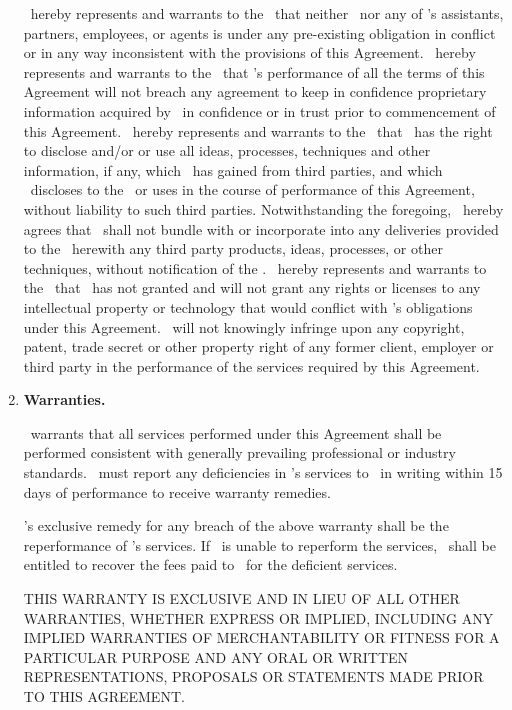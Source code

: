 \documentclass[a4paper,10pt,notitlepage,twocolumn]{article}
\begin{document}
\begin{enumerate}
\cntrref\ hereby represents and warrants to the \clref\ that neither \cntrref\ nor any of \cntrref 's assistants, partners, employees, or agents is under any pre-existing obligation in conflict or in any way inconsistent with the provisions of this Agreement. \cntrref\ hereby represents and warrants to the \clref\ that \cntrref 's performance of all the terms of this Agreement will not breach any agreement to keep in confidence proprietary information acquired by \cntrref\ in confidence or in trust prior to commencement of this Agreement. \cntrref\ hereby represents and warrants to the \clref\ that \cntrref\ has the right to disclose and/or or use all ideas, processes, techniques and other information, if any, which \cntrref\ has gained from third parties, and which \cntrref\ discloses to the \clref\ or uses in the course of performance of this Agreement, without liability to such third parties.  Notwithstanding the foregoing, \cntrref\ hereby agrees that \cntrref\ shall not bundle with or incorporate into any deliveries provided to the \clref\ herewith any third party products, ideas, processes, or other techniques, without notification of the \clref .  \cntrref\ hereby represents and warrants to the \clref\ that \cntrref\ has not granted and will not grant any rights or licenses to any intellectual property or technology that would conflict with \cntrref 's obligations under this Agreement.  \cntrref\ will not knowingly infringe upon any copyright, patent, trade secret or other property right of any former client, employer or third party in the performance of the services required by this Agreement.


\item \textbf{Warranties.}

\cntrref\ warrants that all services performed under this Agreement shall be performed consistent with generally prevailing professional or industry standards. \clref\ must report any deficiencies in \cntrref 's services to \cntrref\ in writing within 15 days of performance to receive warranty remedies.

\clref 's exclusive remedy for any breach of the above warranty shall be the reperformance of \cntrref 's services. If \cntrref\ is unable to reperform the services, \clref\ shall be entitled to recover the fees paid to \cntrref\ for the deficient services. 

THIS WARRANTY IS EXCLUSIVE AND IN LIEU OF ALL OTHER WARRANTIES, WHETHER EXPRESS OR IMPLIED, INCLUDING ANY IMPLIED WARRANTIES OF MERCHANTABILITY OR FITNESS FOR A PARTICULAR PURPOSE AND ANY ORAL OR WRITTEN REPRESENTATIONS, PROPOSALS OR STATEMENTS MADE PRIOR TO THIS AGREEMENT.



\end{enumerate}
\end{document}
